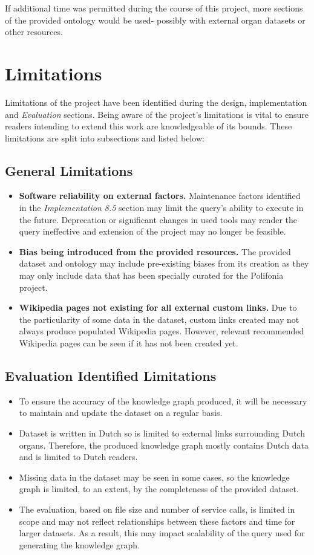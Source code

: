 If additional time was permitted during the course of this project, more sections of the provided ontology would be used- possibly with external organ datasets or other resources. 

\section{Limitations}
Limitations of the project have been identified during the design, implementation and \textit{Evaluation} sections. Being aware of the project's limitations is vital to ensure readers intending to extend this work are knowledgeable of its bounds. These limitations are split into subsections and listed below:

\subsection{General Limitations}
\begin{itemize}
    \item \textbf{Software reliability on external factors.} Maintenance factors identified in the \textit{Implementation 8.5} section may limit the query's ability to execute in the future. Deprecation or significant changes in used tools may render the query ineffective and extension of the project may no longer be feasible. 
    \item \textbf{Bias being introduced from the provided resources.} The provided dataset and ontology may include pre-existing biases from its creation as they may only include data that has been specially curated for the Polifonia project. 
    \item \textbf{Wikipedia pages not existing for all external custom links.} Due to the particularity of some data in the dataset, custom links created may not always produce populated Wikipedia pages. However, relevant recommended Wikipedia pages can be seen if it has not been created yet.  
\end{itemize}

\subsection{Evaluation Identified Limitations}
\begin{itemize}
    \item To ensure the accuracy of the knowledge graph produced, it will be necessary to maintain and update the dataset on a regular basis.
    \item Dataset is written in Dutch so is limited to external links surrounding Dutch organs. Therefore, the produced knowledge graph mostly contains Dutch data and is limited to Dutch readers.  
    \item Missing data in the dataset may be seen in some cases, so the knowledge graph is limited, to an extent, by the completeness of the provided dataset.
    \item  The evaluation, based on file size and number of service calls, is limited in scope and may not reflect relationships between these factors and time for larger datasets. As a result, this may impact scalability of the query used for generating the knowledge graph.
\end{itemize}

